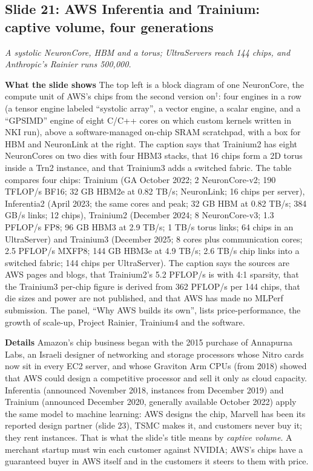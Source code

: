 \documentclass[11pt,letterpaper]{article}
\newcommand{\slide}[3]{%
  \subsection[Slide #1: #2]{Slide #1: #2}%
  {\color{muted}\itshape #3\par}\medskip}
\newcommand{\para}[1]{\medskip\noindent\textbf{#1}\quad}
\begin{document}
\slide{21}{AWS Inferentia and Trainium: captive volume, four generations}{A systolic NeuronCore, HBM and a torus; UltraServers reach 144 chips, and Anthropic's Rainier runs 500,000.}

\para{What the slide shows} The top left is a block diagram of one NeuronCore, the compute unit of AWS's chips from the second version on$^\dagger$: four engines in a row (a tensor engine labeled ``systolic array'', a vector engine, a scalar engine, and a ``GPSIMD'' engine of eight C/C++ cores on which custom kernels written in NKI run), above a software-managed on-chip SRAM scratchpad, with a box for HBM and NeuronLink at the right. The caption says that Trainium2 has eight NeuronCores on two dies with four HBM3 stacks, that 16 chips form a 2D torus inside a Trn2 instance, and that Trainium3 adds a switched fabric. The table compares four chips: Trainium (GA October 2022; 2 NeuronCore-v2; 190 TFLOP/s BF16; 32 GB HBM2e at 0.82 TB/s; NeuronLink; 16 chips per server), Inferentia2 (April 2023; the same cores and peak; 32 GB HBM at 0.82 TB/s; 384 GB/s links; 12 chips), Trainium2 (December 2024; 8 NeuronCore-v3; 1.3 PFLOP/s FP8; 96 GB HBM3 at 2.9 TB/s; 1 TB/s torus links; 64 chips in an UltraServer) and Trainium3 (December 2025; 8 cores plus communication cores; 2.5 PFLOP/s MXFP8; 144 GB HBM3e at 4.9 TB/s; 2.6 TB/s chip links into a switched fabric; 144 chips per UltraServer). The caption says the sources are AWS pages and blogs, that Trainium2's 5.2 PFLOP/s is with 4:1 sparsity, that the Trainium3 per-chip figure is derived from 362 PFLOP/s per 144 chips, that die sizes and power are not published, and that AWS has made no MLPerf submission. The panel, ``Why AWS builds its own'', lists price-performance, the growth of scale-up, Project Rainier, Trainium4 and the software.

\para{Details} Amazon's chip business began with the 2015 purchase of Annapurna Labs, an Israeli designer of networking and storage processors whose Nitro cards now sit in every EC2 server, and whose Graviton Arm CPUs (from 2018) showed that AWS could design a competitive processor and sell it only as cloud capacity. Inferentia (announced November 2018, instances from December 2019) and Trainium (announced December 2020, generally available October 2022) apply the same model to machine learning: AWS designs the chip, Marvell has been its reported design partner (slide 23), TSMC makes it, and customers never buy it; they rent instances. That is what the slide's title means by \emph{captive volume}. A merchant startup must win each customer against NVIDIA; AWS's chips have a guaranteed buyer in AWS itself and in the customers it steers to them with price.
\end{document}
